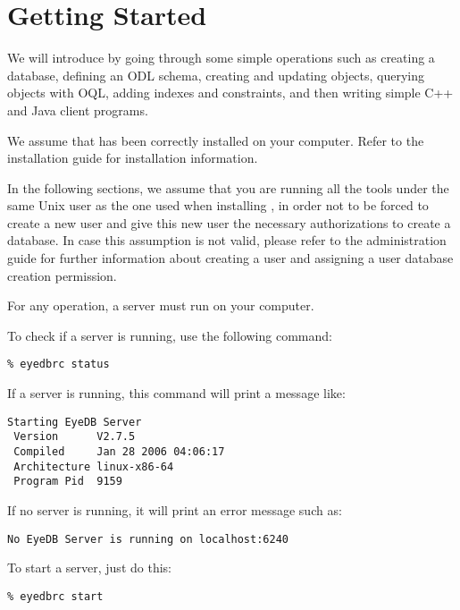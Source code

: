 

\newcommand{\mantitle}{\textsc{Getting Started}}


\tableofcontents

\chapter*{Getting Started}


We will introduce \eyedb by going through some simple 
operations such as creating a database, defining an ODL schema,
creating and updating objects, querying objects with OQL, adding
indexes and constraints, and then writing simple C++ and Java
client programs.

We assume that \eyedb has been correctly installed on your
computer. Refer to the installation guide for installation information.



In the following sections, we assume that you are running all the \eyedb tools under
the same Unix user as the one used when installing \eyedb, in order not to be forced to create a new \eyedb user and give this new user the necessary authorizations to create a database. In case this assumption is not valid, please refer to the administration guide for further information about creating a user and assigning a user database creation permission.

For any \eyedb operation, a server must run on your computer.

To check if a server is running, use the following command:
\verbsize \begin{verbatim}
% eyedbrc status
\end{verbatim}
\normalsize

If a server is running, this command will print a message like:
\verbsize \begin{verbatim}
Starting EyeDB Server
 Version      V2.7.5
 Compiled     Jan 28 2006 04:06:17
 Architecture linux-x86-64
 Program Pid  9159
\end{verbatim}
\normalsize

If no server is running, it will print an error message such as:
\verbsize \begin{verbatim}
No EyeDB Server is running on localhost:6240
\end{verbatim}
\normalsize

To start a server, just do this:
\verbsize \begin{verbatim}
% eyedbrc start
\end{verbatim}
\normalsize

